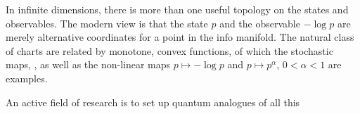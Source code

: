 \documentclass[12pt]{article}
\begin{document}
In infinite dimensions, there is more than one useful topology
on the states and observables.
The modern view \cite{Pistone} is that the state $p$ and the observable
$-\log p$ are merely alternative coordinates for a point
in the info manifold. The natural class of charts are
related by monotone, convex functions, of which the stochastic maps,
\cite{Chentsov}, as well as the non-linear maps $p\mapsto-\log p$ and
$p\mapsto p^\alpha$, $0<\alpha<1$ are examples.

An active field of research is to set up quantum analogues of all this
\cite{Petz,Ray4,Ray5,Ray6} 

\end{document}
